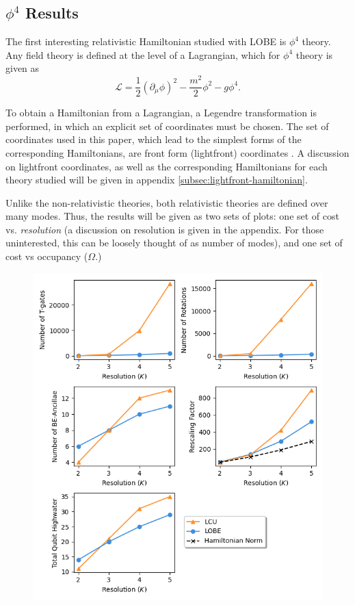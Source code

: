 \subsection{$\phi^4$ Results}
\label{sec:phi4_results}

The first interesting relativistic Hamiltonian studied with LOBE is $\phi^4$ theory. 
Any field theory is defined at the level of a Lagrangian, which for $\phi^4$ theory is given as
\begin{equation}
    \mathcal{L} = \frac12 \left(\partial_\mu \phi \right)^2 - \frac{m^2}{2}\phi^2 - g\phi^4.
\end{equation}

To obtain a Hamiltonian from a Lagrangian, a Legendre transformation is performed, in which an explicit set of coordinates must be chosen. 
The set of coordinates used in this paper, which lead to the simplest forms of the corresponding Hamiltonians, are front form (lightfront) coordinates \cite{Dirac1949}.
A discussion on lightfront coordinates, as well as the corresponding Hamiltonians for each theory studied will be given in appendix \ref{subsec:lightfront-hamiltonian}.

Unlike the non-relativistic theories, both relativistic theories are defined over many modes.
Thus, the results will be given as two sets of plots: one set of cost vs. \textit{resolution} (a discussion on resolution is given in the appendix. For those uninterested, this can be loosely thought of as number of modes), and one set of cost vs occupancy ($\Omega$.)

\begin{figure}[h]
    \centering
    \includegraphics[width = 15cm]{figures/phi4_resolutions.png}
    \caption{}
    \label{}
\end{figure}

